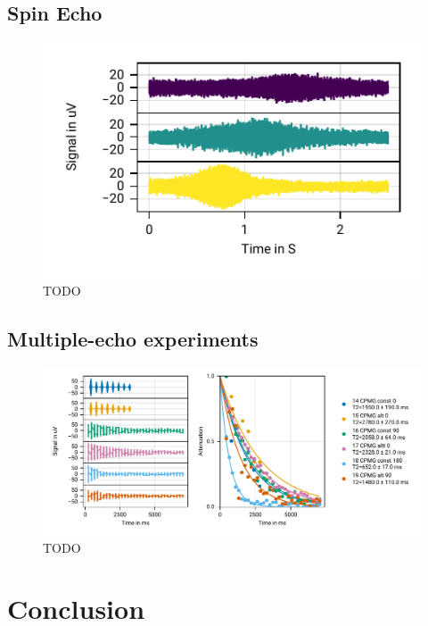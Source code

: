 \documentclass[
    parskip=half, 
    twoside=false,
    twocolumn=true,
    fontsize=11pt,
]{scrarticle}
\begin{document}
\subsection{Spin Echo}
\begin{figure}
    \centering
    \includegraphics{figures/04 spin echo shims.pdf}
    \caption{TODO}
\end{figure}

\subsection{Multiple-echo experiments}
\begin{figure}
    \centering
    \includegraphics{figures/05 CPMG.pdf}
    \caption{TODO}
\end{figure}


\section{Conclusion}

\nocite{*}
\printbibliography
\end{document}
